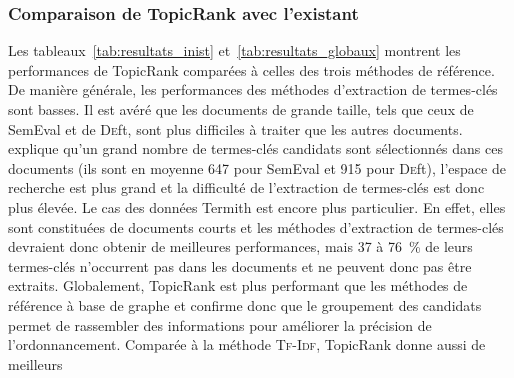       \subsubsection{Comparaison de TopicRank avec l'existant}
      \label{subsubsec:main:domain_independent_keyphrase_extraction-unsupervised_automatic_keyphrase_extraction-evaluation-comparison}
        Les tableaux~\ref{tab:resultats_inist} et~\ref{tab:resultats_globaux}
        montrent les performances de TopicRank comparées à celles des trois
        méthodes de référence. De manière générale, les performances des
        méthodes d'extraction de termes-clés sont basses. Il est avéré que les
        documents de grande taille, tels que ceux de SemEval et de
        \textsc{De}ft, sont plus difficiles à traiter que les autres documents.
         explique qu'un grand nombre de
        termes-clés candidats sont sélectionnés dans ces documents (ils sont en
        moyenne 647 pour SemEval et 915 pour \textsc{De}ft), l'espace de
        recherche est plus grand et la difficulté de l'extraction de termes-clés
        est donc plus élevée. Le cas des données Termith
        est encore plus particulier. En effet, elles sont constituées de
        documents courts et les méthodes d'extraction de termes-clés devraient
        donc obtenir de meilleures performances, mais 37 à 76~\% de leurs
        termes-clés n'occurrent pas dans les documents et ne peuvent donc pas
        être extraits.
        Globalement, TopicRank est plus performant que les méthodes de référence
        à base de graphe et confirme donc que le groupement des candidats
        permet de rassembler des informations pour améliorer la précision de
        l'ordonnancement.
        Comparée à la méthode \textsc{Tf-Idf}, TopicRank donne aussi de meilleurs
